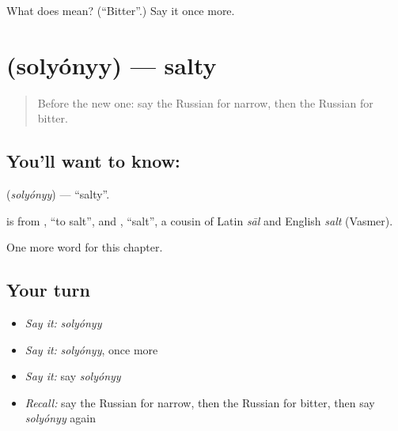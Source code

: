 \begin{tcolorbox}[breakable,colback=teal!4,colframe=teal!35!black,title={Before you move on}]
What does  mean? (\textquotedblleft{}Bitter\textquotedblright{}.) Say it once more.
\end{tcolorbox}
\section[\texorpdfstring{\ru{солёный} (solyónyy)}{солёный (solyónyy)}]{ (solyónyy) — salty}

\label{lesson:RU-C130-salty}



\begin{quote}
Before the new one: say the Russian for narrow, then the Russian for bitter.
\end{quote}

\subsection*{You'll want to know: }
\textbf{} (\emph{solyónyy}) — \textquotedblleft{}salty\textquotedblright{}.

\begin{cousinweb}
\textbf{} is from \emph{}, \textquotedblleft{}to salt\textquotedblright{}, and \emph{}, \textquotedblleft{}salt\textquotedblright{}, a cousin of Latin \emph{sāl} and English \emph{salt} (Vasmer).
\end{cousinweb}

\begin{grammarlens}[title={What you've built}]
One more word for this chapter.
\end{grammarlens}

\subsection*{Your turn}
\begin{itemize}
\raggedright
  \item \emph{Say it:} \emph{solyónyy}
  \item \emph{Say it:} \emph{solyónyy}, once more
  \item \emph{Say it:} say \emph{solyónyy}
  \item \emph{Recall:} say the Russian for narrow, then the Russian for bitter, then say \emph{solyónyy} again
\end{itemize}

